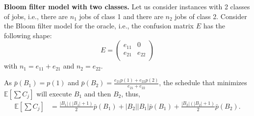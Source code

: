 \documentclass{article}
\newcommand{\E}{\mathbb{E}}
\begin{document}



\noindent\textbf{Bloom filter model with two classes.}
Let us consider instances with 2 classes of jobs, i.e., there are \(n_1\) jobs of class 1 and there are \(n_2\) jobs of class 2.
Consider the Bloom filter model for the oracle, i.e., the confusion matrix \(E\) has the following shape:
\[
    E=\begin{pmatrix}
        e_{11} & 0 \\
        e_{21} & e_{22} \\
    \end{pmatrix}
\]
with \(n_1=e_{11}+e_{21}\) and \(n_2=e_{22}\).

As \(\bar{p}(B_1)=p(1)\) and \(\bar{p}(B_2)=\frac{e_{21}p(1)+e_{22}p(2)}{e_{21}+e_{22}}\), the schedule that minimizes \(\E\left[\sum C_j\right]\) will execute \(B_1\) and then \(B_2\), thus,
\begin{align*}
    \E\left[\sum C_j\right]
    &=\frac{|B_1|(|B_1|+1)}{2}\bar{p}(B_1)+|B_2||B_1|\bar{p}(B_1)+\frac{|B_2|(|B_2|+1)}{2}\bar{p}(B_2).
\end{align*}
\end{document}
